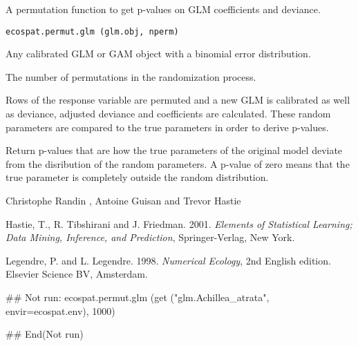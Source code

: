 \documentclass[a4paper]{book}
\begin{document}
%
\begin{Description}\relax
A permutation function to get p-values on GLM coefficients and deviance.
\end{Description}
%
\begin{Usage}
\begin{verbatim}
ecospat.permut.glm (glm.obj, nperm)
\end{verbatim}
\end{Usage}
%
\begin{Arguments}
\begin{ldescription}
\item[\code{glm.obj}] Any calibrated GLM or GAM object with a binomial error distribution.
\item[\code{nperm}] The number of permutations in the randomization process.
\end{ldescription}
\end{Arguments}
%
\begin{Details}\relax
Rows of the response variable are permuted and a new GLM is calibrated as well as deviance, adjusted deviance and coefficients are calculated. These random parameters are compared to the true parameters in order to derive p-values.
\end{Details}
%
\begin{Value}
Return p-values that are how the true parameters of the original model deviate from the disribution of the random parameters. A p-value of zero means that the true parameter is completely outside the random distribution.
\end{Value}
%
\begin{Author}\relax
Christophe Randin , Antoine Guisan  and Trevor Hastie
\end{Author}
%
\begin{References}\relax
Hastie, T., R. Tibshirani and J. Friedman. 2001. \emph{Elements of Statistical Learning; Data Mining, Inference, and Prediction}, Springer-Verlag, New York.

Legendre, P. and L. Legendre. 1998. \emph{Numerical Ecology}, 2nd English edition. Elsevier Science BV, Amsterdam.
\end{References}
%
\begin{Examples}
\begin{ExampleCode}

## Not run: 
ecospat.permut.glm (get ("glm.Achillea_atrata", envir=ecospat.env), 1000)

## End(Not run)
\end{ExampleCode}
\end{Examples}
\end{document}
